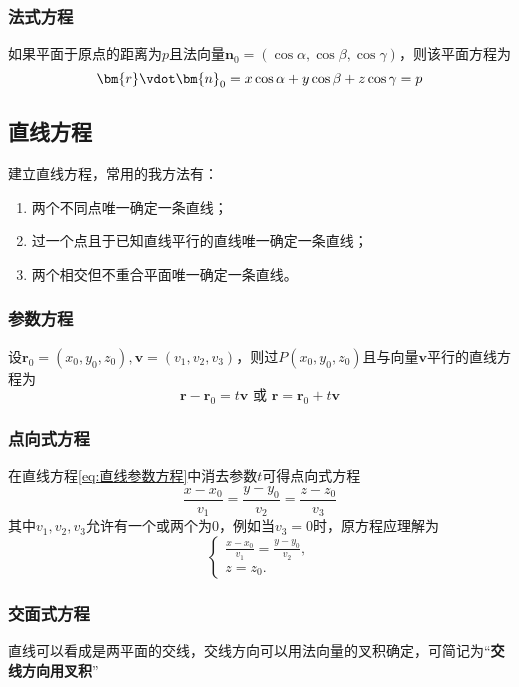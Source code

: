 \subsubsection{法式方程}
如果平面于原点的距离为$p$且法向量$\bm{n}_0=(\cos\alpha,\cos\beta,\cos\gamma)$，则该平面方程为
\begin{equation}
    \label{eq:平面法式方程}
    \bm{r}\vdot\bm{n}_0 = x\cos\alpha + y\cos\beta + z\cos\gamma = p
\end{equation}

\subsection{直线方程}
建立直线方程，常用的我方法有：
\begin{enumerate}[(1)]
    \item 两个不同点唯一确定一条直线；
    \item 过一个点且于已知直线平行的直线唯一确定一条直线；
    \item 两个相交但不重合平面唯一确定一条直线。
\end{enumerate}

\subsubsection{参数方程}
设$\bm{r}_0=(x_0,y_0,z_0),\bm{v}=(v_1,v_2,v_3)$，则过$P(x_0,y_0,z_0)$且与向量$\bm{v}$平行的直线方程为
\begin{equation}
    \label{eq:直线参数方程}
    \bm{r}-\bm{r}_0 = t\bm{v}\text{ 或~} \bm{r} = \bm{r}_0 + t\bm{v}
\end{equation}

\subsubsection{点向式方程}
在直线方程\ref{eq:直线参数方程}中消去参数$t$可得点向式方程
\begin{equation}
    \label{eq:直线点向式方程}
    \frac{x-x_0}{v_1} = \frac{y-y_0}{v_2} = \frac{z-z_0}{v_3}
\end{equation}
其中$v_1,v_2,v_3$允许有一个或两个为$0$，例如当$v_3=0$时，原方程应理解为
\[
    \begin{cases}
        \frac{x-x_0}{v_1} = \frac{y-y_0}{v_2}, \\
        z=z_0.
    \end{cases}
\]

\subsubsection{交面式方程}
直线可以看成是两平面的交线，交线方向可以用法向量的叉积确定，可简记为“\textbf{\textsf{交线方向用叉积}}”

